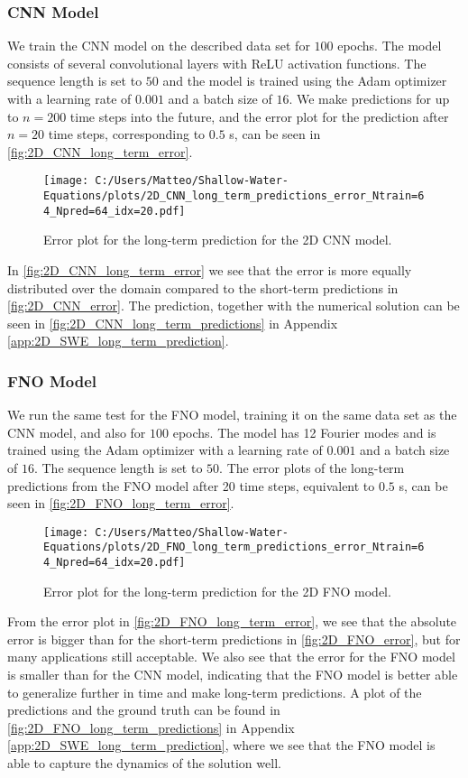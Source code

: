 \subsubsection*{CNN Model}
We train the CNN model on the described data set for $100$ epochs.
The model consists of several convolutional layers with ReLU activation functions.
The sequence length is set to $50$ and the model is trained using the Adam optimizer with a learning rate of $0.001$ and a batch size of $16$.
We make predictions for up to $n = 200$ time steps into the future, and the error plot for the prediction after $n = 20$ time steps, corresponding to $0.5$ s, can be seen in \autoref{fig:2D_CNN_long_term_error}.
\begin{figure}[H]
    \centering
    \texttt{[image: C:/Users/Matteo/Shallow-Water-Equations/plots/2D\_CNN\_long\_term\_predictions\_error\_Ntrain=64\_Npred=64\_idx=20.pdf]}
    \caption{Error plot for the long-term prediction for the 2D CNN model.}\label{fig:2D_CNN_long_term_error}
\end{figure}
In \autoref{fig:2D_CNN_long_term_error} we see that the error is more equally distributed over the domain compared to the short-term predictions in \autoref{fig:2D_CNN_error}.
The prediction, together with the numerical solution can be seen in \autoref{fig:2D_CNN_long_term_predictions} in Appendix \autoref{app:2D_SWE_long_term_prediction}.


\subsubsection*{FNO Model}
We run the same test for the FNO model, training it on the same data set as the CNN model, and also for $100$ epochs.
The model has 12 Fourier modes and is trained using the Adam optimizer with a learning rate of $0.001$ and a batch size of $16$.
The sequence length is set to $50$.
The error plots of the long-term predictions from the FNO model after 20 time steps, equivalent to $0.5$ s, can be seen in \autoref{fig:2D_FNO_long_term_error}.
\begin{figure}[H]
    \centering
    \texttt{[image: C:/Users/Matteo/Shallow-Water-Equations/plots/2D\_FNO\_long\_term\_predictions\_error\_Ntrain=64\_Npred=64\_idx=20.pdf]}
    \caption{Error plot for the long-term prediction for the 2D FNO model.}\label{fig:2D_FNO_long_term_error}
\end{figure}
From the error plot in \autoref{fig:2D_FNO_long_term_error}, we see that the absolute error is bigger than for the short-term predictions in \autoref{fig:2D_FNO_error}, but for many applications still acceptable.
We also see that the error for the FNO model is smaller than for the CNN model, indicating that the FNO model is better able to generalize further in time and make long-term predictions.
A plot of the predictions and the ground truth can be found in \autoref{fig:2D_FNO_long_term_predictions} in Appendix \autoref{app:2D_SWE_long_term_prediction}, where we see that the FNO model is able to capture the dynamics of the solution well.

